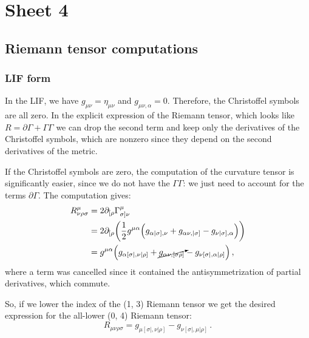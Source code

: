 \documentclass[main.tex]{subfiles}
\begin{document}
\section{Sheet 4}

\subsection{Riemann tensor computations}

\subsubsection{LIF form} \label{sec:LIF-form-Riemann-tensor}

In the LIF, we have \(g_{\mu \nu } = \eta_{\mu \nu }\) and \( g_{\mu \nu , \alpha }=0\). Therefore, the Christoffel symbols are all zero. 
In the explicit expression of the Riemann tensor, which looks like \(R = \partial \Gamma  + \Gamma \Gamma\) we can drop the second term and keep only the derivatives of the Christoffel symbols, which are nonzero since they depend on the second derivatives of the metric.

If the Christoffel symbols are zero, the computation of the curvature tensor is significantly easier, since we do not have the \(\Gamma \Gamma \): we just need to account for the terms \(\partial \Gamma \). The computation gives: 
%
\begin{subequations}
\begin{align}
  R^{\mu }_{\nu \rho \sigma }
  &=  2 \partial_{[\rho }\Gamma^{\mu }_{\sigma ] \nu}  \\
  &= 2 \partial_{[\rho } \qty(\frac{1}{2} g^{\mu \alpha } \qty(g_{\alpha |\sigma ], \nu } + g_{\alpha \nu  , |\sigma  ]} - g_{\nu  |\sigma], \alpha }))  \\
  &= g^{\mu \alpha }\qty(g_{\alpha [\sigma |, \nu | \rho      ]} + \cancelto{}{g_{\alpha \nu, [\sigma \rho]}}-g_{\nu [\sigma |, \alpha | \rho  ]})
\,,
\end{align}
\end{subequations}
%
where a term was cancelled since it contained the antisymmetrization of partial derivatives, which commute.

So, if we lower the index of the (1, 3) Riemann tensor we get the desired expression for the all-lower (0, 4) Riemann tensor: 
%
\begin{equation}
  R_{\mu \nu \rho \sigma} = g_{\mu [\sigma |, \nu |\rho ]} - g_{\nu  [\sigma |, \mu | \rho ]} 
\,.
\end{equation}
\end{document}
